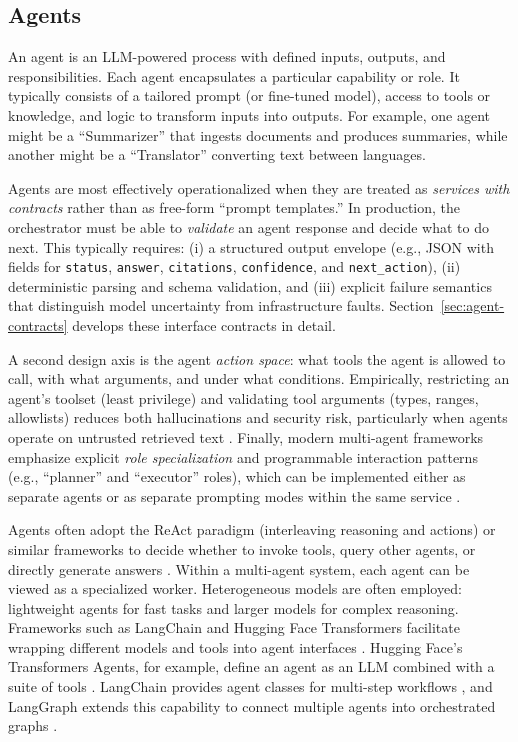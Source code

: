 \subsection{Agents}
An agent is an LLM-powered process with defined inputs, outputs, and responsibilities. Each agent encapsulates a particular capability or role. It typically consists of a tailored prompt (or fine-tuned model), access to tools or knowledge, and logic to transform inputs into outputs. For example, one agent might be a “Summarizer” that ingests documents and produces summaries, while another might be a “Translator” converting text between languages.  

Agents are most effectively operationalized when they are treated as \emph{services with contracts} rather than as free-form ``prompt templates.'' 
In production, the orchestrator must be able to \emph{validate} an agent response and decide what to do next.
This typically requires: (i) a structured output envelope (e.g., JSON with fields for \texttt{status}, \texttt{answer}, \texttt{citations}, \texttt{confidence}, and \texttt{next\_action}), (ii) deterministic parsing and schema validation, and (iii) explicit failure semantics that distinguish model uncertainty from infrastructure faults.
Section~\ref{sec:agent-contracts} develops these interface contracts in detail.

A second design axis is the agent \emph{action space}: what tools the agent is allowed to call, with what arguments, and under what conditions.
Empirically, restricting an agent's toolset (least privilege) and validating tool arguments (types, ranges, allowlists) reduces both hallucinations and security risk, particularly when agents operate on untrusted retrieved text \cite{Schick2023Toolformer,Greshake2023IndirectPromptInjection}.
Finally, modern multi-agent frameworks emphasize explicit \emph{role specialization} and programmable interaction patterns (e.g., ``planner'' and ``executor'' roles), which can be implemented either as separate agents or as separate prompting modes within the same service \cite{Wu2023AutoGen,Shen2023HuggingGPT}.

Agents often adopt the ReAct paradigm (interleaving reasoning and actions) or similar frameworks to decide whether to invoke tools, query other agents, or directly generate answers \cite{Yao2022ReAct,Schick2023Toolformer,huggingfaceAgents,huggingfaceAgents2}. Within a multi-agent system, each agent can be viewed as a specialized worker. Heterogeneous models are often employed: lightweight agents for fast tasks and larger models for complex reasoning. Frameworks such as LangChain \cite{blogLangChain} and Hugging Face Transformers facilitate wrapping different models and tools into agent interfaces \cite{huggingfaceTransformers}. Hugging Face's Transformers Agents, for example, define an agent as an LLM combined with a suite of tools \cite{huggingfaceAgents3}. LangChain provides agent classes for multi-step workflows \cite{blogLangChain}, and LangGraph extends this capability to connect multiple agents into orchestrated graphs \cite{langchain}.  

